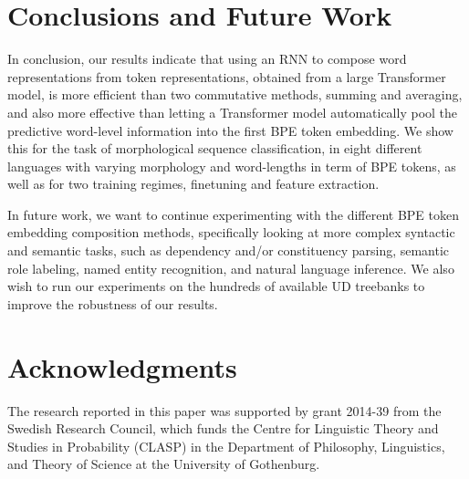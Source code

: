 \documentclass[11pt]{article}
\begin{document}
    

    \section{Conclusions and Future Work}


                In conclusion, our results indicate that using an RNN
     to compose word representations from token representations,
     obtained from a large Transformer model, is more efficient than
     two commutative methods, summing and averaging, and also more
     effective than letting a Transformer model automatically pool the
     predictive word-level information into the first BPE token
     embedding.
                We show this for the task of morphological sequence
     classification, in eight different languages with varying
     morphology and word-lengths in term of BPE tokens, as well as for
     two training regimes, finetuning and feature extraction.
     
        In future work, we want to continue experimenting with the
     different BPE token embedding composition methods, specifically
     looking at more complex syntactic and semantic tasks, such as
     dependency and/or constituency parsing, semantic role labeling,
     named entity recognition, and natural language inference.
            We also wish to run our experiments on the hundreds of
     available UD treebanks to improve the robustness of our results.
    
	\section*{Acknowledgments}
            The research reported in this paper was supported by grant
     2014-39 from the Swedish Research Council, which funds the Centre
     for Linguistic Theory and Studies in Probability (CLASP) in the
     Department of Philosophy, Linguistics, and Theory of Science at
     the University of Gothenburg.

	
	
	
\end{document}
